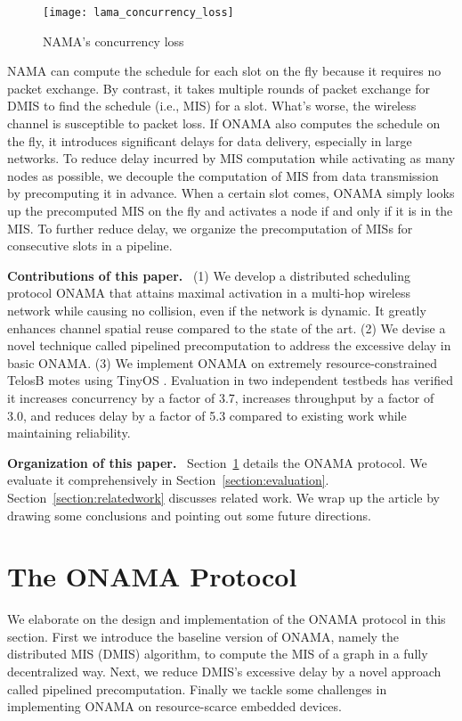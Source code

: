 \documentclass[conference]{IEEEtran}
\newcommand{\vSpacing}{\vspace*{0.05cm}}
\newcommand{\subHeading}[1]{
\vSpacing
\noindent \textbf{#1} \  
}
\begin{document}
\begin{figure}[!tbhp]
\centering
\texttt{[image: lama\_concurrency\_loss]}
\caption{NAMA's concurrency loss}
\label{fig:lama_concurrency_loss}
\end{figure}



NAMA can compute the schedule for each slot on the fly because it requires no packet exchange. By contrast, it takes multiple rounds of packet exchange for DMIS to find the schedule (i.e., MIS) for a slot. What's worse, the wireless channel is susceptible to packet loss.
If ONAMA also computes the schedule on the fly, it introduces significant delays for data delivery, especially in large networks. To reduce delay incurred by MIS computation while activating as many nodes as possible, we decouple the computation of MIS from data transmission by precomputing it in advance. When a certain slot comes, ONAMA simply looks up the precomputed MIS on the fly and activates a node if and only if it is in the MIS.
To further reduce delay, we organize the precomputation of MISs for consecutive slots in a pipeline.



\subHeading{Contributions of this paper.}(1) We develop a distributed scheduling protocol ONAMA that attains maximal activation in a multi-hop wireless network while causing no collision, even if the network is dynamic. It greatly enhances channel spatial reuse compared to the state of the art. (2) We devise a novel technique called pipelined precomputation to address the excessive delay in basic ONAMA. (3) We implement ONAMA on extremely resource-constrained TelosB \cite{telosb} motes using TinyOS \cite{tinyos}. Evaluation in two independent testbeds has verified it increases concurrency by a factor of 3.7, increases throughput by a factor of 3.0, and reduces delay by a factor of 5.3 compared to existing work while maintaining reliability.

\subHeading{Organization of this paper.}Section~\ref{section:protocol} details the ONAMA protocol. We evaluate it comprehensively in Section~\ref{section:evaluation}. Section~\ref{section:relatedwork} discusses related work. We wrap up the article by drawing some conclusions and pointing out some future directions.
 \section{The ONAMA Protocol}	\label{section:protocol}
We elaborate on the design and implementation of the ONAMA protocol in this section. First we introduce the baseline version of ONAMA, namely the distributed MIS (DMIS) algorithm, to compute the MIS of a graph in a fully decentralized way. Next, we reduce DMIS's excessive delay by a novel approach called pipelined precomputation. Finally we tackle some challenges in implementing ONAMA on resource-scarce embedded devices.
\end{document}

